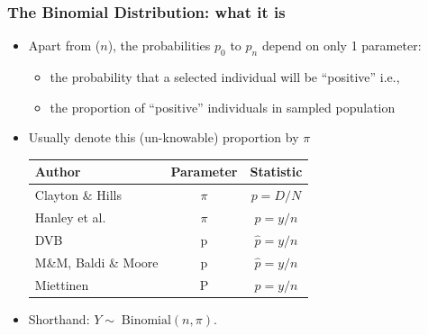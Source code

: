 \documentclass[10pt,handout]{beamer}\usepackage[]{graphicx}\usepackage[]{color}
\begin{document}
\begin{frame}
	\frametitle{The Binomial Distribution: what it is}
	\begin{itemize}
		\setlength\itemsep{0.5em}
		\item Apart from  ($n$), the probabilities $p_{0}$ to $p_{n}$ depend on only 1 parameter:
		\begin{itemize}
			\item the probability that a selected individual will be ``positive''  i.e.,
			\item the proportion of ``positive'' individuals in sampled population
		\end{itemize}
		
		\item Usually denote this (un-knowable) proportion by $\pi$
		
		\begin{tabular}{lcc}
			\hline
			Author & \textbf{Parameter} & \textbf{Statistic} \\
			\hline
			Clayton \& Hills   & $\pi $ & $p= D/N$ \\
			Hanley et al. & $\pi $ & $p= y/n$ \\
			DVB & p &$\hat{p} = y/n$ \\
			M\&M, Baldi \& Moore & p &$\hat{p} = y/n$ \\
			Miettinen& P & $p=y/n$ \\
			\hline
		\end{tabular}
		\item
		Shorthand:  $Y\sim\; \textrm{Binomial}(n, \pi)$.
	\end{itemize}
\end{frame}
\end{document}
